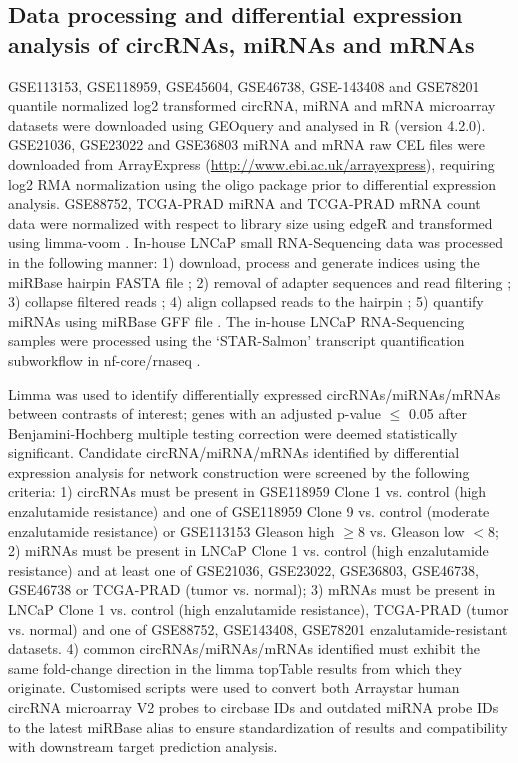 \documentclass[twocolumn]{bmcart}%
\begin{document}
\subsection*{\textbf{Data processing and differential expression analysis of circRNAs, miRNAs and mRNAs}}
GSE113153, GSE118959, GSE45604, GSE46738, GSE-143408 and GSE78201 quantile normalized log2 transformed circRNA, miRNA and mRNA microarray datasets were downloaded using GEOquery \cite{Davis2007Jul} and analysed in R (version 4.2.0). GSE21036, GSE23022 and GSE36803 miRNA and mRNA raw CEL files were downloaded from ArrayExpress \cite{Parkinson2007Jan} (\url{http://www.ebi.ac.uk/arrayexpress}), requiring log2 RMA normalization using the oligo package \cite{Carvalho2010Oct} prior to differential expression analysis. GSE88752, TCGA-PRAD miRNA and TCGA-PRAD mRNA count data were normalized with respect to library size using edgeR \cite{Robinson2010Jan} and transformed using limma-voom \cite{Law2014Feb}. In-house LNCaP small RNA-Sequencing data was processed in the following manner: 1) download, process and generate indices using the miRBase hairpin FASTA file \cite{Bowtie, Shen2016Oct}; 2) removal of adapter sequences and read filtering \cite{Krueger2023Feb}; 3) collapse filtered reads \cite{Pantano2016Mar}; 4) align collapsed reads to the hairpin \cite{Bowtie}; 5) quantify miRNAs using miRBase GFF file \cite{Desvignes2020Feb}. The in-house LNCaP RNA-Sequencing samples were processed using the `STAR-Salmon' transcript quantification subworkflow in nf-core/rnaseq \cite{Patel2023Jun}.
\par
Limma \cite{Ritchie2015Apr} was used to identify differentially expressed circRNAs/miRNAs/mRNAs between contrasts of interest; genes with an adjusted p-value $\leq$ 0.05 after Benjamini-Hochberg multiple testing correction were deemed statistically significant. Candidate circRNA/miRNA/mRNAs identified by differential expression analysis for network construction were screened by the following criteria: 1) circRNAs must be present in GSE118959 Clone 1 vs. control (high enzalutamide resistance) and one of GSE118959 Clone 9 vs. control (moderate enzalutamide resistance) or GSE113153 Gleason high $\geq$8 vs. Gleason low $<$8; 2) miRNAs must be present in LNCaP Clone 1 vs. control (high enzalutamide resistance) and at least one of GSE21036, GSE23022, GSE36803, GSE46738, GSE46738 or TCGA-PRAD (tumor vs. normal); 3) mRNAs must be present in LNCaP Clone 1 vs. control (high enzalutamide resistance), TCGA-PRAD (tumor vs. normal) and one of GSE88752, GSE143408, GSE78201 enzalutamide-resistant datasets. 4) common circRNAs/miRNAs/mRNAs identified must exhibit the same fold-change direction in the limma topTable results from which they originate. Customised scripts were used to convert both Arraystar human circRNA microarray V2 probes to circbase IDs and outdated miRNA probe IDs to the latest miRBase alias to ensure standardization of results and compatibility with downstream target prediction analysis. 
\end{document}
